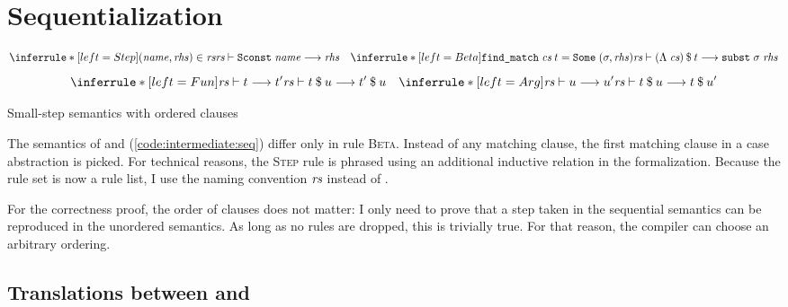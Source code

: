 
\section{Sequentialization}
\label{sec:intermediate:seq}


\begin{code}[t]
  \[
    \inferrule*[left=Step]{(\mathit{name}, \mathit{rhs}) \in \rs}{\rewrite{\rs}{\holconst{Sconst}\;\mathit{name}}{\mathit{rhs}}}
    \quad
    \inferrule*[left=Beta]{\holconst{find\_match}\;\cs\;t = \holconst{Some}\;(\sigma, \mathit{rhs})}{\rewrite{\rs}{\app{(\Lambda\; \cs)}{t}}{\holconst{subst}\;\sigma\;\mathit{rhs}}}
  \]
  \[
    \inferrule*[left=Fun]{\rewrite{\rs}{t}{t'}}{\rewrite{\rs}{\app t u}{\app{t'}{u}}}
    \quad
    \inferrule*[left=Arg]{\rewrite{\rs}{u}{u'}}{\rewrite{\rs}{\app t u}{\app{t}{u'}}}
  \]
  \caption{Small-step semantics with ordered clauses}
  \label{code:intermediate:seq}
\end{code}

\noindent
The semantics of  and  (\cref{code:intermediate:seq}) differ only in rule \textsc{Beta}.
Instead of any matching clause, the first matching clause in a case abstraction is picked.
For technical reasons, the \textsc{Step} rule is phrased using an additional inductive relation in the formalization.
Because the rule set is now a rule list, I use the naming convention $\textit{rs}$ instead of \R.

For the correctness proof, the order of clauses does not matter:
I only need to prove that a step taken in the sequential semantics can be reproduced in the unordered semantics.
As long as no rules are dropped, this is trivially true.
For that reason, the compiler can choose an arbitrary ordering.


\subsection{Translations between  and }

